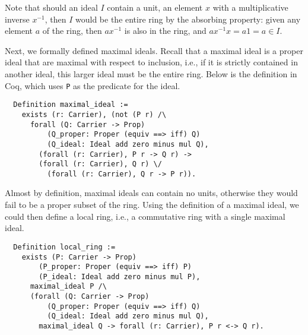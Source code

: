 \documentclass{article}
\begin{document}
Note
that should an ideal \(I\) contain a unit, an element \(x\) with a
multiplicative inverse \(x^{-1}\), then \(I\) would be the entire ring by the
absorbing property: given any element \(a\) of the ring, then \(a x^{-1}\) is
also in the ring, and \(a x^{-1} x = a 1 = a\in I\). 

Next, we formally defined maximal ideals.  Recall that a maximal ideal is a proper ideal that are maximal with respect to inclusion, i.e., if it is strictly contained in another ideal, this larger ideal must be the entire ring. 
Below is the definition in Coq,
which uses \texttt{P} as the predicate for the ideal.

\begin{verbatim}
  Definition maximal_ideal :=
    exists (r: Carrier), (not (P r) /\
      forall (Q: Carrier -> Prop)
          (Q_proper: Proper (equiv ==> iff) Q)
          (Q_ideal: Ideal add zero minus mul Q),
        (forall (r: Carrier), P r -> Q r) ->
        (forall (r: Carrier), Q r) \/
          (forall (r: Carrier), Q r -> P r)).
\end{verbatim}

Almost by definition, maximal ideals can contain no units, otherwise they would
fail to be a proper subset of the ring. 
 Using the definition of a maximal ideal, we could then define a local ring, i.e., a commutative ring with a single maximal ideal.
 
 \begin{verbatim}
  Definition local_ring :=
    exists (P: Carrier -> Prop)
        (P_proper: Proper (equiv ==> iff) P)
        (P_ideal: Ideal add zero minus mul P),
      maximal_ideal P /\
      (forall (Q: Carrier -> Prop)
          (Q_proper: Proper (equiv ==> iff) Q)
          (Q_ideal: Ideal add zero minus mul Q),
        maximal_ideal Q -> forall (r: Carrier), P r <-> Q r).
\end{verbatim}
\end{document}
